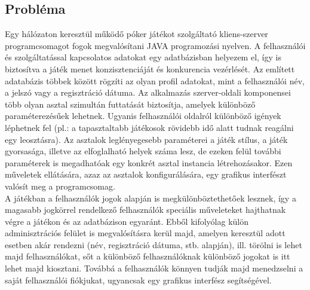 \subsection{Probléma}
Egy hálózaton keresztül működő póker játékot szolgáltató kliens-szerver programcsomagot fogok megvalósítani JAVA programozási nyelven. A felhasználói és szolgáltatással kapcsolatos adatokat egy adatbázisban helyezem el, így is biztosítva a játék menet konzisztenciáját és konkurencia vezérlését. Az említett adatabázis többek között rögzíti az olyan profil adatokat, mint a felhasználói név, a jelszó vagy a regisztráció dátuma.
Az alkalmazás szerver-oldali komponensei több olyan asztal szimultán futtatását biztosítja, amelyek különböző paraméterezésűek lehetnek. Ugyanis felhasználói oldalról különböző igények léphetnek fel (pl.: a tapasztaltabb játékosok rövidebb idő alatt tudnak reagálni egy leosztásra). Az asztalok leglényegesebb paraméterei a játék stílus, a játék gyorsasága, illetve az elfoglalható helyek száma lesz, de ezeken felül további paraméterek is megadhatóak egy konkrét asztal instancia létrehozásakor. Ezen műveletek ellátására, azaz az asztalok konfigurálására, egy grafikus interfészt valósít meg a programcsomag. \\
A játékban a felhasználók jogok alapján is megkülönböztethetőek lesznek, így a magasabb jogkörrel rendelkező felhasználók speciális műveleteket hajthatnak végre a játékon és az adatbázison egyaránt. Ebből kifolyólag külön adminisztrációs felület is megvalósításra kerül majd, amelyen keresztül adott esetben akár rendezni (név, regisztráció dátuma, stb. alapján), ill. törölni is lehet majd felhasználókat, sőt a különböző felhasználóknak különböző jogokat is itt lehet majd kiosztani. Továbbá a felhasználók könnyen tudják majd menedzselni a saját felhasználói fiókjukat, ugyancsak egy grafikus interfész segítségével.

